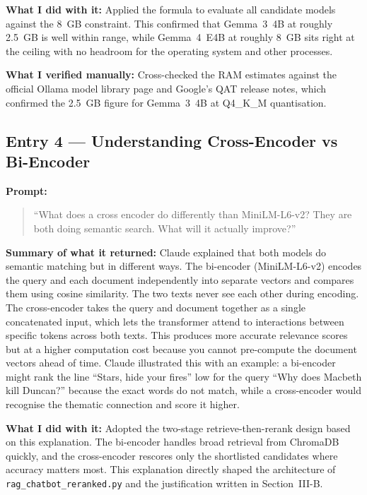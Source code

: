 \documentclass[10pt,conference]{IEEEtran}
\begin{document}
\textbf{What I did with it:}
Applied the formula to evaluate all candidate models against the 8~GB
constraint. This confirmed that Gemma~3~4B at roughly 2.5~GB is well
within range, while Gemma~4~E4B at roughly 8~GB sits right at the
ceiling with no headroom for the operating system and other processes.

\textbf{What I verified manually:}
Cross-checked the RAM estimates against the official Ollama model library
page and Google's QAT release notes, which confirmed the 2.5~GB figure
for Gemma~3~4B at Q4\_K\_M quantisation.

\subsection*{Entry 4 --- Understanding Cross-Encoder vs Bi-Encoder}

\textbf{Prompt:}
\begin{quote}
``What does a cross encoder do differently than MiniLM-L6-v2?
They are both doing semantic search. What will it actually improve?''
\end{quote}

\textbf{Summary of what it returned:}
Claude explained that both models do semantic matching but in different
ways. The bi-encoder (MiniLM-L6-v2) encodes the query and each document
independently into separate vectors and compares them using cosine
similarity. The two texts never see each other during encoding. The
cross-encoder takes the query and document together as a single
concatenated input, which lets the transformer attend to interactions
between specific tokens across both texts. This produces more accurate
relevance scores but at a higher computation cost because you cannot
pre-compute the document vectors ahead of time. Claude illustrated this
with an example: a bi-encoder might rank the line ``Stars, hide your
fires'' low for the query ``Why does Macbeth kill Duncan?'' because the
exact words do not match, while a cross-encoder would recognise the
thematic connection and score it higher.

\textbf{What I did with it:}
Adopted the two-stage retrieve-then-rerank design based on this
explanation. The bi-encoder handles broad retrieval from ChromaDB
quickly, and the cross-encoder rescores only the shortlisted candidates
where accuracy matters most. This explanation directly shaped the
architecture of \texttt{rag\_chatbot\_reranked.py} and the justification
written in Section~III-B.
\end{document}
